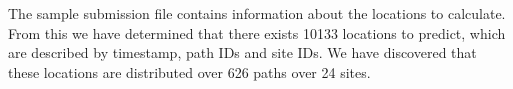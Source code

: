 The sample submission file contains information about the locations to calculate. From this we have determined that there exists 10133 locations to predict, which are described by timestamp, path IDs and site IDs. We have discovered that these locations are distributed over 626 paths over 24 sites.

